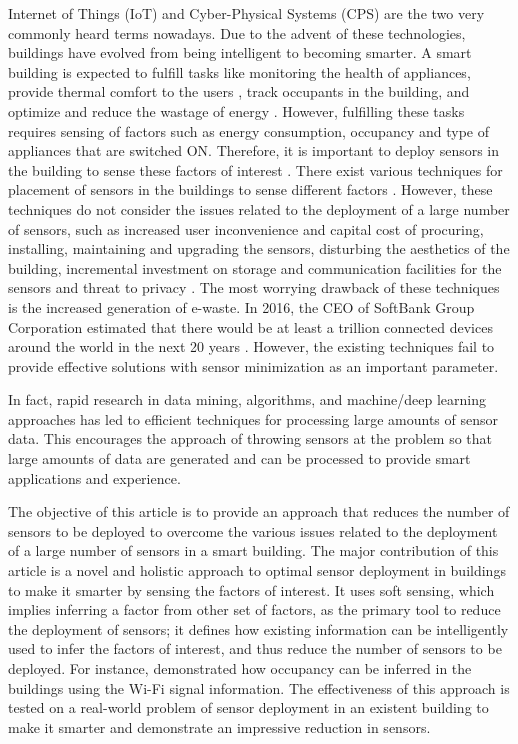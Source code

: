 \documentclass[]{interact}
\theoremstyle{plain}%
\theoremstyle{definition}
\theoremstyle{remark}
\begin{document}
Internet of Things (IoT) and Cyber-Physical Systems (CPS) are the two very commonly heard terms nowadays. Due to the advent of these technologies, buildings have evolved from being intelligent to becoming smarter. A smart building is expected to fulfill tasks like monitoring the health of appliances, provide thermal comfort to the users \citep{elsevier_hvac}, track occupants in the building, and optimize and reduce the wastage of energy \citep{karmakar}. However, fulfilling these tasks requires sensing of factors such as energy consumption, occupancy and type of appliances that are switched ON. Therefore, it is important to deploy sensors in the building to sense these factors of interest \citep{anshul_sensys_demo}. 
There exist various techniques for placement of sensors in the buildings to sense different factors \citep{bellala_electrons, meyn}. However, these techniques do not consider the issues related to the deployment of a large number of sensors, such as increased user inconvenience and capital cost of procuring, installing, maintaining and upgrading the sensors, disturbing the aesthetics of the building, incremental investment on storage and communication facilities for the sensors and threat to privacy \citep{hitchhiker_sensors,stankovic_iot}. The most worrying drawback of these techniques is the increased generation of e-waste. 
In 2016, the CEO of SoftBank Group Corporation estimated that there would be at least a trillion connected devices around the world in the next 20 years \citep{IntofTrash}. However, the existing techniques fail to provide effective solutions with sensor minimization as an important parameter.


In fact, rapid research in data mining, algorithms, and machine/deep learning approaches has led to efficient techniques for processing large amounts of sensor data. This encourages the approach of throwing sensors at the problem so that large amounts of data are generated and can be processed to provide smart applications and experience. 

The objective of this article is to provide an approach that reduces the number of sensors to be deployed to overcome the various issues related to the deployment of a large number of sensors in a smart building. The major contribution of this article is a novel and holistic approach to optimal sensor deployment in buildings to make it smarter by sensing the factors of interest. It uses soft sensing, which implies inferring a factor from other set of factors, as the primary tool to reduce the deployment of sensors; it defines how existing information can be intelligently used to infer the factors of interest, and thus reduce the number of sensors to be deployed. For instance, \cite{occupancy_wifi} demonstrated how occupancy can be inferred in the buildings using the Wi-Fi signal information. The effectiveness of this approach is tested on a real-world problem of sensor deployment in an existent building to make it smarter and demonstrate an impressive reduction in sensors.
\end{document}
